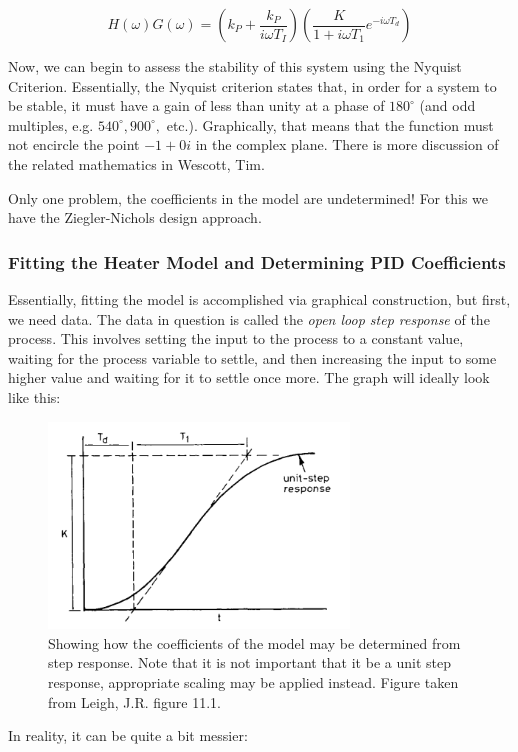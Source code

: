 \documentclass[11pt, letterpaper]{article}
\begin{document}
$$ H(\omega)G(\omega) = \left( k_P + \frac{k_P}{i \omega T_I}\right)\left( \frac{K}{1+i\omega T_{1}} e^{-i \omega T_d} \right)$$

Now, we can begin to assess the stability of this system using the Nyquist Criterion. Essentially, the Nyquist criterion states that, in order for a system to be stable, it must have a gain of less than unity at a phase of $180^{\circ}$ (and odd multiples, e.g. $540^{\circ},900^{\circ},$ etc.). Graphically, that means that the function must not encircle the point $-1+0i$ in the complex plane. There is more discussion of the related mathematics in Wescott, Tim.

Only one problem, the coefficients in the model are undetermined! For this we have the Ziegler-Nichols design approach.

\subsubsection{Fitting the Heater Model and Determining PID Coefficients}
Essentially, fitting the model is accomplished via graphical construction, but first, we need data. The data in question is called the {\it open loop step response} of the process. This involves setting the input to the process to a constant value, waiting for the process variable to settle, and then increasing the input to some higher value and waiting for it to settle once more. The graph will ideally look like this:

\begin{figure}[H]
    \centering
    \includegraphics[width=8cm]{openLoopStep.png}
    \caption{ Showing how the coefficients of the model may be determined from step response. Note that it is not important that it be a unit step response, appropriate scaling may be applied instead. Figure taken from Leigh, J.R. figure 11.1.}
    \label{fig:openLoopStep}
\end{figure}

In reality, it can be quite a bit messier:
\end{document}
